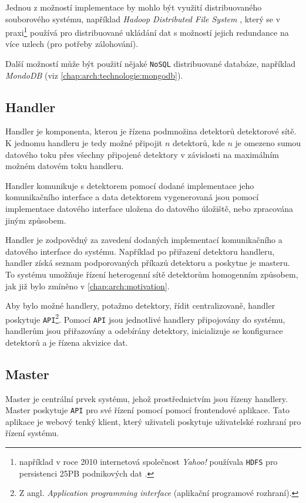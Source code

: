 Jednou z možností implementace by mohlo být využití distribuovaného souborového systému, například \textit{Hadoop Distributed File System} \cite{HDFS}, který se v praxi\footnote{například v roce 2010 internetová společnost \textit{Yahoo!} používala \texttt{HDFS} pro persistenci \unit{25}{PB} podnikových dat \cite{HDFS}.} používá pro distribuované ukládání dat s možností jejich redundance na více uzlech (pro potřeby zálohování). 

Další možností může být použití nějaké \texttt{NoSQL} distribuované databáze, například \textit{MondoDB} (viz \ref{chap:arch:technologie:mongodb}).

\subsection{Handler}
Handler je komponenta, kterou je řízena podmnožina detektorů detektorové sítě. K jednomu handleru je tedy možné připojit $n$ detektorů, kde $n$ je omezeno sumou datového toku přes všechny připojené detektory v závislosti na maximálním možném datovém toku handleru.

Handler komunikuje s detektorem pomocí dodané implementace jeho komunikačního interface a data detektorem vygenerovaná jsou pomocí implementace datového interface uložena do datového úložiště, nebo zpracována jiným způsobem.

Handler je zodpovědný za zavedení dodaných implementací komunikačního a datového interface do systému. Například po přiřazení detektoru handleru, handler získá seznam podporovaných příkazů detektoru a poskytne je masteru. To systému umožňuje řízení heterogenní sítě detektorům homogenním způsobem, jak již bylo zmíněno v \ref{chap:arch:motivation}.

Aby bylo možné handlery, potažmo detektory, řídit centralizovaně, handler poskytuje \texttt{API}\footnote{Z angl. \textit{Application programming interface} (aplikační programové rozhraní).}. Pomocí \texttt{API} jsou jednotlivé handlery připojovány do systému, handlerům jsou přiřazovány a odebírány detektory, inicializuje se konfigurace detektorů a je řízena akvizice dat.

\subsection{Master}
Master je centrální prvek systému, jehož prostřednictvím jsou řízeny handlery. Master poskytuje \texttt{API} pro své řízení pomocí pomocí frontendové aplikace. Tato aplikace je webový tenký klient, který uživateli poskytuje uživatelské rozhraní pro řízení systému.

